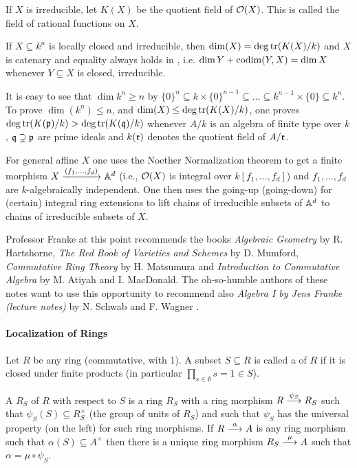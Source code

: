 \documentclass[a4paper,parskip=full,numbers=enddot]{scrreprt}
\begin{document}
If $X$ is irreducible, let $K(X)$ be the quotient field of $\Oo(X)$. This is called the field of rational functions on $X$.
\begin{thm}
    If $X\subseteq k^n$ is locally closed and irreducible, then $\dim(X) = \deg\tr (K(X)/k)$ and $X$ is catenary and equality always holds in , i.e. $\dim Y +\codim(Y,X) = \dim X$ whenever $Y\subseteq X$ is closed, irreducible.
\end{thm}
\begin{rem}
    It is easy to see that $\dim k^n \geq n$ by $\{0\}^n \subseteq k\times\{0\}^{n-1} \subseteq\ldots\subseteq k^{n-1}\times\{0\} \subseteq k^n$. To prove $\dim(k^n) \leq n$, and $\dim(X) \leq\deg\tr(K(X)/k)$, one proves $\deg\tr(K(\pp)/k) > \deg\tr(K(\qq)/k)$ whenever $A/k$ is an algebra of finite type over $k$, $\qq\supsetneq \pp$ are prime ideals and $k(\rr)$ denotes the quotient field of $A/\rr$. 
    
    For general affine $X$ one uses the Noether Normalization theorem to get a finite morphism $X\xrightarrow{(f_1,\ldots,f_d)} \IA^d$ (i.e., $\Oo(X)$ is integral over $k[f_1,\ldots,f_d]$) and $f_1,\ldots,f_d$ are $k$-algebraically independent. One then uses the going-up (going-down) for (certain) integral ring extensions to lift chains of irreducible subsets of $\IA^d$ to chains of irreducible subsets of $X$.
    
    Professor Franke at this point recommends the books \emph{Algebraic Geometry} by R. Hartshorne, \emph{The Red Book of Varieties and Schemes} by D. Mumford, \emph{Commutative Ring Theory} by H. Matsumura and \emph{Introduction to Commutative Algebra} by M. Atiyah and I. MacDonald. The oh-so-humble authors of these notes want to use this opportunity to recommend also \emph{Algebra I by Jens Franke (lecture notes)} by N. Schwab and F. Wagner \cite{alg1}.
\end{rem}
\paragraph{Localization of Rings}
\begin{defi}
    Let $R$ be any ring (commutative, with 1). A subset $S\subseteq R$ is called a  of $R$ if it is closed under finite products (in particular $\prod_{s\in\emptyset} s = 1 \in S$).
\end{defi}
\begin{defi}
    A  $R_S$ of $R$ with respect to $S$ is a ring $R_S$ with a ring morphism $R\morphism[\psi_S] R_S$ such that $\psi_S(S)\subseteq R_S^\times$ (the group of units of $R_S$) and such that $\psi_S$ has the universal property (on the left) for such ring morphisms. If $R\morphism[\alpha] A$ is any ring morphism such that $\alpha(S) \subseteq A^\times$ then there is a unique ring morphism $R_S\morphism[\mu] A$ such that $\alpha = \mu\circ \psi_S$. 
\end{defi}
\end{document}
